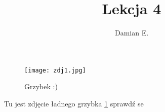 \documentclass{article}
\begin{document}
\author{Damian E.}
\title{Lekcja 4}


\begin{figure}[h!]
    \centering
    \texttt{[image: zdj1.jpg]}
    \caption{Grzybek :)}
    \label{fig:grzyb}
\end{figure}


Tu jest zdjęcie ładnego grzybka \ref{fig:grzyb} sprawdź se
\end{document}
